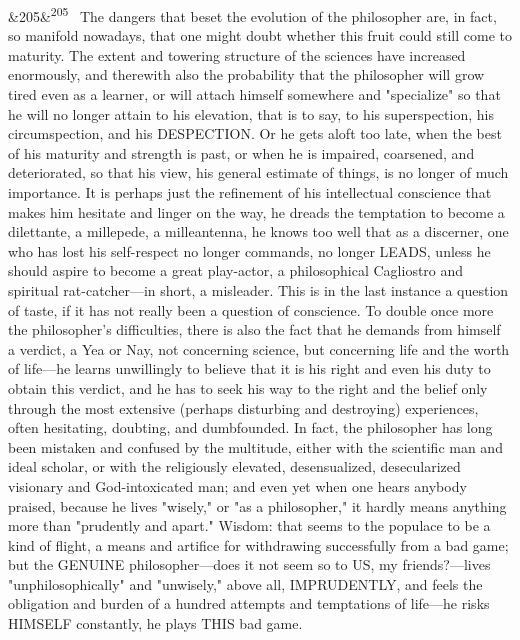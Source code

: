 \documentclass[12pt]{article}
\newcommand{\para}[1][]{\par\noindent\ifx&#1&\else\textsuperscript{\footnotesize #1}~\fi}
\begin{document}
\para[205] The dangers that beset the evolution of the philosopher are, in fact, so manifold nowadays, that one might doubt whether this fruit could still come to maturity. The extent and towering structure of the sciences have increased enormously, and therewith also the probability that the philosopher will grow tired even as a learner, or will attach himself somewhere and "specialize" so that he will no longer attain to his elevation, that is to say, to his superspection, his circumspection, and his DESPECTION. Or he gets aloft too late, when the best of his maturity and strength is past, or when he is impaired, coarsened, and deteriorated, so that his view, his general estimate of things, is no longer of much importance. It is perhaps just the refinement of his intellectual conscience that makes him hesitate and linger on the way, he dreads the temptation to become a dilettante, a millepede, a milleantenna, he knows too well that as a discerner, one who has lost his self-respect no longer commands, no longer LEADS, unless he should aspire to become a great play-actor, a philosophical Cagliostro and spiritual rat-catcher---in short, a misleader. This is in the last instance a question of taste, if it has not really been a question of conscience. To double once more the philosopher's difficulties, there is also the fact that he demands from himself a verdict, a Yea or Nay, not concerning science, but concerning life and the worth of life---he learns unwillingly to believe that it is his right and even his duty to obtain this verdict, and he has to seek his way to the right and the belief only through the most extensive (perhaps disturbing and destroying) experiences, often hesitating, doubting, and dumbfounded. In fact, the philosopher has long been mistaken and confused by the multitude, either with the scientific man and ideal scholar, or with the religiously elevated, desensualized, desecularized visionary and God-intoxicated man; and even yet when one hears anybody praised, because he lives "wisely," or "as a philosopher," it hardly means anything more than "prudently and apart." Wisdom: that seems to the populace to be a kind of flight, a means and artifice for withdrawing successfully from a bad game; but the GENUINE philosopher---does it not seem so to US, my friends?---lives "unphilosophically" and "unwisely," above all, IMPRUDENTLY, and feels the obligation and burden of a hundred attempts and temptations of life---he risks HIMSELF constantly, he plays THIS bad game.
\end{document}
